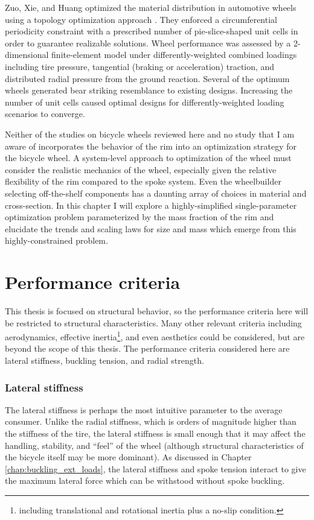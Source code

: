 \documentclass[\rootdir/thesis.tex]{subfiles}
\begin{document}
Zuo, Xie, and Huang optimized the material distribution in automotive wheels using a topology optimization approach \cite{Zuo2011}. They enforced a circumferential periodicity constraint with a prescribed number of pie-slice-shaped unit cells in order to guarantee realizable solutions. Wheel performance was assessed by a 2-dimensional finite-element model under differently-weighted combined loadings including tire pressure, tangential (braking or acceleration) traction, and distributed radial pressure from the ground reaction. Several of the optimum wheels generated bear striking resemblance to existing designs. Increasing the number of unit cells caused optimal designs for differently-weighted loading scenarios to converge.

Neither of the studies on bicycle wheels \cite{Svensson2015,Keller2013} reviewed here and no study that I am aware of incorporates the behavior of the rim into an optimization strategy for the bicycle wheel. A system-level approach to optimization of the wheel must consider the realistic mechanics of the wheel, especially given the relative flexibility of the rim compared to the spoke system. Even the wheelbuilder selecting off-the-shelf components has a daunting array of choices in material and cross-section. In this chapter I will explore a highly-simplified single-parameter optimization problem parameterized by the mass fraction of the rim and elucidate the trends and scaling laws for size and mass which emerge from this highly-constrained problem.


\section{Performance criteria}
\label{sec:performance_criteria}

This thesis is focused on structural behavior, so the performance criteria here will be restricted to structural characteristics. Many other relevant criteria including aerodynamics, effective inertia\footnote{including translational and rotational inertia plus a no-slip condition.}, and even aesthetics could be considered, but are beyond the scope of this thesis. The performance criteria considered here are lateral stiffness, buckling tension, and radial strength.

\subsubsection*{Lateral stiffness}
The lateral stiffness is perhaps the most intuitive parameter to the average consumer. Unlike the radial stiffness, which is orders of magnitude higher than the stiffness of the tire, the lateral stiffness is small enough that it may affect the handling, stability, and ``feel'' of the wheel (although structural characteristics of the bicycle itself may be more dominant). As discussed in Chapter \ref{chap:buckling_ext_loads}, the lateral stiffness and spoke tension interact to give the maximum lateral force which can be withstood without spoke buckling.
\end{document}
